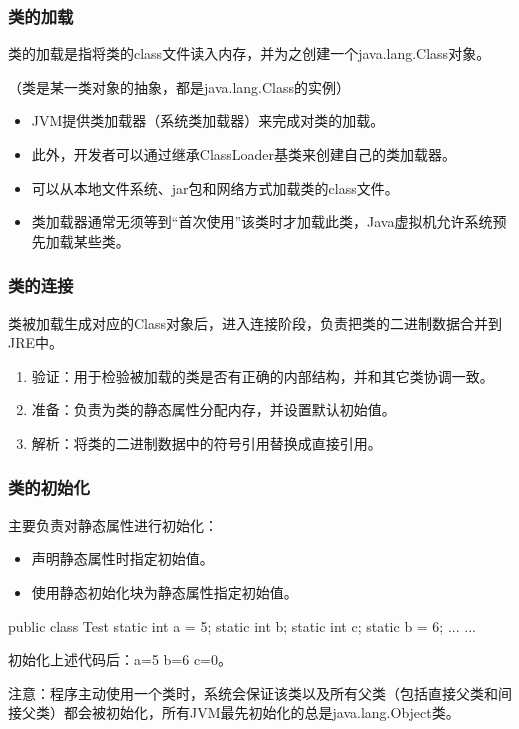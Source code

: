 \begin{frame}[fragile] %
\frametitle{类的加载}

类的加载是指将类的class文件读入内存，并为之创建一个java.lang.Class对象。

{\Red （类是某一类对象的抽象，都是java.lang.Class的实例）}

\begin{itemize}\kai
\item JVM提供类加载器（系统类加载器）来完成对类的加载。
\item 此外，开发者可以通过继承ClassLoader基类来创建自己的类加载器。
\item 可以从本地文件系统、jar包和网络方式加载类的class文件。
\item 类加载器通常无须等到“首次使用”该类时才加载此类，Java虚拟机允许系统预先加载某些类。
\end{itemize}

\end{frame}

\begin{frame}[fragile] %
\frametitle{类的连接}

类被加载生成对应的Class对象后，进入连接阶段，负责把类的二进制数据合并到JRE中。

\begin{enumerate}
\item 验证：用于检验被加载的类是否有正确的内部结构，并和其它类协调一致。
\item 准备：负责为类的静态属性分配内存，并设置默认初始值。
\item 解析：将类的二进制数据中的符号引用替换成直接引用。
\end{enumerate}
\end{frame}

\begin{frame}[fragile] %
\frametitle{类的初始化}

主要负责对静态属性进行初始化：
\begin{itemize}
\item 声明静态属性时指定初始值。
\item 使用静态初始化块为静态属性指定初始值。
\end{itemize}

\begin{javaCode}
public class Test {
  static int a = 5;
  static int b;
  static int c;
  static {
    b = 6;
  }
  ... ...
}  
\end{javaCode}
初始化上述代码后：a=5 b=6 c=0。

{\kai\Red 注意：程序主动使用一个类时，系统会保证该类以及所有父类（包括直接父类和间接父类）都会被初始化，所有JVM最先初始化的总是java.lang.Object类。}
\end{frame}

